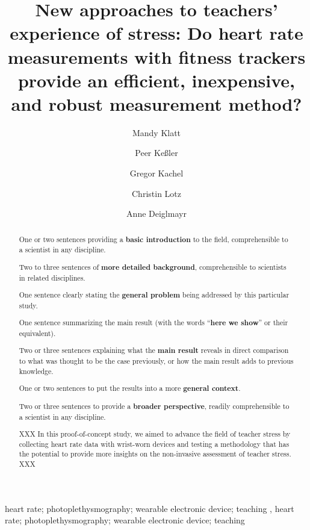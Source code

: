 \documentclass[]{elsarticle} %
\begin{document}
\begin{frontmatter}

  \title{New approaches to teachers' experience of stress: Do heart rate
measurements with fitness trackers provide an efficient, inexpensive,
and robust measurement method?}
    \author[1]{Mandy Klatt%
  }
    \author[1]{Peer Keßler%
  }
  
    \author[1,2]{Gregor Kachel%
  }
  
    \author[1]{Christin Lotz%
  }
  
    \author[1]{Anne Deiglmayr%
  }
  
  
  \begin{abstract}
  One or two sentences providing a \textbf{basic introduction} to the
  field, comprehensible to a scientist in any discipline.

  Two to three sentences of \textbf{more detailed background},
  comprehensible to scientists in related disciplines.

  One sentence clearly stating the \textbf{general problem} being
  addressed by this particular study.

  One sentence summarizing the main result (with the words
  ``\textbf{here we show}'' or their equivalent).

  Two or three sentences explaining what the \textbf{main result}
  reveals in direct comparison to what was thought to be the case
  previously, or how the main result adds to previous knowledge.

  One or two sentences to put the results into a more \textbf{general
  context}.

  Two or three sentences to provide a \textbf{broader perspective},
  readily comprehensible to a scientist in any discipline.

  XXX In this proof-of-concept study, we aimed to advance the field of
  teacher stress by collecting heart rate data with wrist-worn devices
  and testing a methodology that has the potential to provide more
  insights on the non-invasive assessment of teacher stress. XXX
  \end{abstract}
    \begin{keyword}
    heart rate; photoplethysmography; wearable electronic device;
teaching \sep 
    heart rate; photoplethysmography; wearable electronic device;
teaching
  \end{keyword}
  
 \end{frontmatter}
\end{document}
